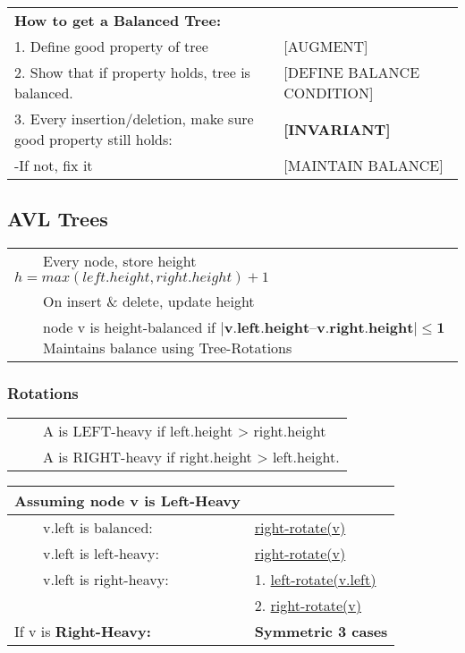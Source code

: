 \documentclass{article}
\newcommand{\tabitem}{~~\llap{\textbullet}~~}
\begin{document}
    \bigskip
    
    \noindent\begin{tabular}{ll}
        \textbf{How to get a Balanced Tree:}\\
        1. Define good property of tree & [AUGMENT]\\
        2. Show that if property holds, tree is balanced. & [DEFINE BALANCE CONDITION]\\
        3. Every insertion/deletion, make sure good property still holds: & \textbf{[INVARIANT]}\\
        -If not, fix it & [MAINTAIN BALANCE]\\
    \end{tabular}

    \pagebreak

    \subsection{AVL Trees}
    \begin{tabular}{l}
        \tabitem Every node, store height $h = max(left.height, right.height) + 1$ \\
        \tabitem On insert \& delete, update height\\
        \tabitem node v is height-balanced if $\bm{|v.left.height – v.right.height| \leq 1}$
        \tabitem Maintains balance using Tree-Rotations
    \end{tabular}

    \subsubsection{Rotations}

    \begin{tabular}{l}
        \tabitem A is LEFT-heavy if left.height > right.height\\
        \tabitem A is RIGHT-heavy if right.height > left.height.\\
    \end{tabular}

    \bigskip

    \noindent\begin{tabular}{ll}
        \toprule
        \textbf{Assuming node v is Left-Heavy}\\
        \hline
        \hline
        \tabitem v.left is balanced: & \hyperref[rightrot]{right-rotate(v)}\\
        \hline
        \tabitem v.left is left-heavy: & \hyperref[rightrot2]{right-rotate(v)}\\
        \hline
        \tabitem v.left is right-heavy: & 1. \hyperref[case31]{left-rotate(v.left)}\\
        & 2. \hyperref[case32]{right-rotate(v)}\\
        \bottomrule
        If v is \textbf{Right-Heavy: } & \textbf{Symmetric 3 cases}\\
        \bottomrule
    \end{tabular}
\end{document}
